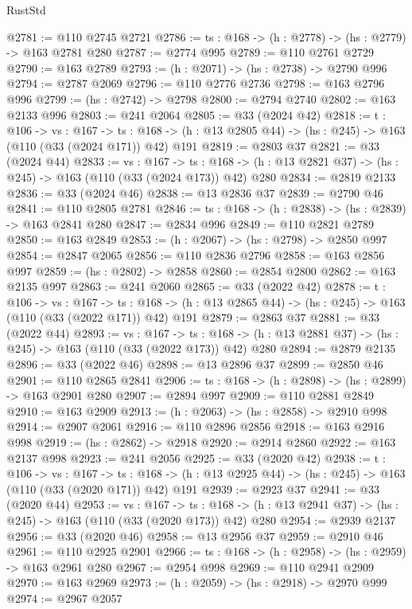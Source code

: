 \begin{lexlean}{RustStd}
\begin{coremodule}
{\begin{coremodule}
{{{{{@2781 := @110 @2745 @2721
@2786 := {ts : @168} -> (h : @2778) -> (hs : @2779) -> @163 @2781 @280
@2787 := @2774 @995
@2789 := @110 @2761 @2729
@2790 := @163 @2789
@2793 := (h : @2071) -> (hs : @2738) -> @2790 @996
@2794 := @2787 @2069
@2796 := @110 @2776 @2736
@2798 := @163 @2796 @996
@2799 := (hs : @2742) -> @2798
@2800 := @2794 @2740
@2802 := @163 @2133 @996
@2803 := @241 @2064
@2805 := @33 (@2024 @42)
@2818 := {t : @106} ->
  {vs : @167} ->
  {ts : @168} -> (h : @13 @2805 @44) -> (hs : @245) -> @163 (@110 (@33 (@2024 @171)) @42) @191
@2819 := @2803 @37
@2821 := @33 (@2024 @44)
@2833 := {vs : @167} ->
  {ts : @168} -> (h : @13 @2821 @37) -> (hs : @245) -> @163 (@110 (@33 (@2024 @173)) @42) @280
@2834 := @2819 @2133
@2836 := @33 (@2024 @46)
@2838 := @13 @2836 @37
@2839 := @2790 @46
@2841 := @110 @2805 @2781
@2846 := {ts : @168} -> (h : @2838) -> (hs : @2839) -> @163 @2841 @280
@2847 := @2834 @996
@2849 := @110 @2821 @2789
@2850 := @163 @2849
@2853 := (h : @2067) -> (hs : @2798) -> @2850 @997
@2854 := @2847 @2065
@2856 := @110 @2836 @2796
@2858 := @163 @2856 @997
@2859 := (hs : @2802) -> @2858
@2860 := @2854 @2800
@2862 := @163 @2135 @997
@2863 := @241 @2060
@2865 := @33 (@2022 @42)
@2878 := {t : @106} ->
  {vs : @167} ->
  {ts : @168} -> (h : @13 @2865 @44) -> (hs : @245) -> @163 (@110 (@33 (@2022 @171)) @42) @191
@2879 := @2863 @37
@2881 := @33 (@2022 @44)
@2893 := {vs : @167} ->
  {ts : @168} -> (h : @13 @2881 @37) -> (hs : @245) -> @163 (@110 (@33 (@2022 @173)) @42) @280
@2894 := @2879 @2135
@2896 := @33 (@2022 @46)
@2898 := @13 @2896 @37
@2899 := @2850 @46
@2901 := @110 @2865 @2841
@2906 := {ts : @168} -> (h : @2898) -> (hs : @2899) -> @163 @2901 @280
@2907 := @2894 @997
@2909 := @110 @2881 @2849
@2910 := @163 @2909
@2913 := (h : @2063) -> (hs : @2858) -> @2910 @998
@2914 := @2907 @2061
@2916 := @110 @2896 @2856
@2918 := @163 @2916 @998
@2919 := (hs : @2862) -> @2918
@2920 := @2914 @2860
@2922 := @163 @2137 @998
@2923 := @241 @2056
@2925 := @33 (@2020 @42)
@2938 := {t : @106} ->
  {vs : @167} ->
  {ts : @168} -> (h : @13 @2925 @44) -> (hs : @245) -> @163 (@110 (@33 (@2020 @171)) @42) @191
@2939 := @2923 @37
@2941 := @33 (@2020 @44)
@2953 := {vs : @167} ->
  {ts : @168} -> (h : @13 @2941 @37) -> (hs : @245) -> @163 (@110 (@33 (@2020 @173)) @42) @280
@2954 := @2939 @2137
@2956 := @33 (@2020 @46)
@2958 := @13 @2956 @37
@2959 := @2910 @46
@2961 := @110 @2925 @2901
@2966 := {ts : @168} -> (h : @2958) -> (hs : @2959) -> @163 @2961 @280
@2967 := @2954 @998
@2969 := @110 @2941 @2909
@2970 := @163 @2969
@2973 := (h : @2059) -> (hs : @2918) -> @2970 @999
@2974 := @2967 @2057
}}}}}
\end{coremodule}}
\end{coremodule}
\end{lexlean}
